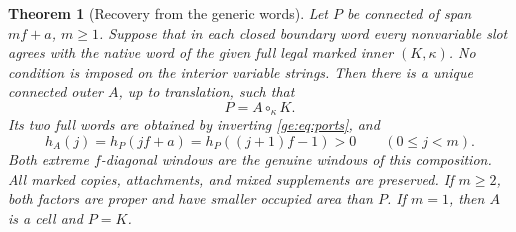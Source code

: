\documentclass[11pt,a4paper]{amsart}
\numberwithin{equation}{section}
\theoremstyle{plain}
\newtheorem{theorem}{Theorem}[section]
\theoremstyle{definition}
\begin{document}
\begin{theorem}[Recovery from the generic words]\label{ge:decoder}
Let \(P\) be connected of span \(mf+a\), \(m\ge1\).  Suppose that in
\emph{each} closed boundary word every nonvariable slot agrees with the
native word of the given full legal marked inner \((K,\kappa)\).  No
condition is imposed on the interior variable strings.  Then there is a
unique connected outer \(A\), up to translation, such that
\[
 P=A\circ_\kappa K.
\]
Its two full words are obtained by inverting \eqref{ge:eq:ports}, and
\begin{equation}\label{ge:eq:sample}
 h_A(j)=h_P(jf+a)=h_P((j+1)f-1)>0\qquad(0\le j<m).
\end{equation}
Both extreme \(f\)-diagonal windows are the genuine windows of this
composition.  All marked copies, attachments, and mixed supplements are
preserved.  If \(m\ge2\), both factors are proper and have smaller occupied
area than \(P\).  If \(m=1\), then \(A\) is a cell and \(P=K\).
\end{theorem}
\end{document}
